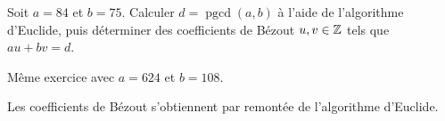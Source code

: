 \documentclass[11pt,class=report,crop=false]{standalone}
\newcommand{\pgcd}{\mathop{\mathrm{pgcd}}\nolimits}
\begin{document}
    




\bigskip
\bigskip





\exercice{}
\enonce
Soit $a=84$ et $b=75$. Calculer $d=\pgcd(a,b)$ à l'aide de l'algorithme d'Euclide, puis déterminer des coefficients de Bézout $u,v \in \mathbb{Z}$ tels que $au+bv=d$.

Même exercice avec $a=624$ et $b=108$.
\finenonce

\indication
Les coefficients de Bézout s'obtiennent par remontée de l'algorithme d'Euclide.
\finindication

\correction
\sauteligne
\end{document}
